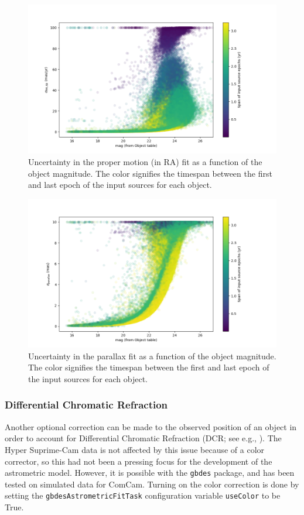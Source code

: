 \documentclass[DM,authoryear,toc]{lsstdoc}
\begin{document}
\begin{figure}
\includegraphics[width=\columnwidth]{figures/pm_ra_sigma_9813.png}
\caption{Uncertainty in the proper motion (in RA) fit as a function of the object magnitude. The color signifies the timespan between the first and last epoch of the input sources for each object.}
\label{fig:pm ra sigma}
\end{figure}
\begin{figure}
\includegraphics[width=\columnwidth]{figures/parallax_sigma_9813.png}
\caption{Uncertainty in the parallax fit as a function of the object magnitude. The color signifies the timespan between the first and last epoch of the input sources for each object.}
\label{fig:parallax sigma}
\end{figure}


\subsubsection{Differential Chromatic Refraction}\label{sec:dcr}
Another optional correction can be made to the observed position of an object in order to account for Differential Chromatic Refraction (DCR; see e.g., ). The Hyper Suprime-Cam data is not affected by this issue because of a color corrector, so this had not been a pressing focus for the development of the astrometric model. However, it is possible with the \texttt{gbdes} package, and has been tested on simulated data for ComCam. Turning on the color correction is done by setting the \texttt{gbdesAstrometricFitTask} configuration variable \texttt{useColor} to be True.
\end{document}
